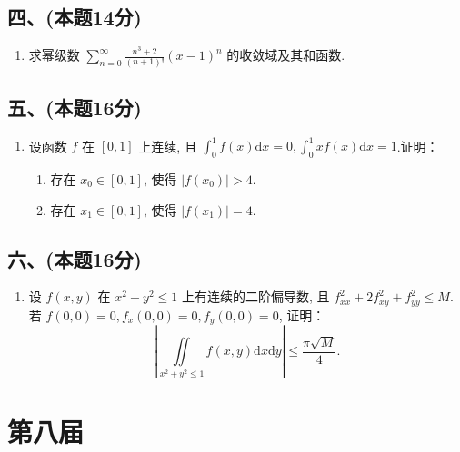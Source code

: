 \subsection*{四、(本题14分)}
\begin{enumerate}[start=8]
    \item 求幂级数 $\displaystyle\sum_{n=0}^{\infty} \frac{n^3 + 2}{(n + 1)!} (x - 1)^n$ 的收敛域及其和函数.
\end{enumerate}

\subsection*{五、(本题16分)}
\begin{enumerate}[start=9]
    \item 设函数 $f$ 在 $[0,  1]$ 上连续,  且 $\displaystyle\int_0^1 f(x)  \mathrm{d}x = 0,  \displaystyle\int_0^1 x f(x)  \mathrm{d}x = 1$.证明：
          \begin{enumerate}
              \item [(1)] 存在 $x_0 \in [0,  1]$,  使得 $|f(x_0)| > 4$.
              \item [(2)] 存在 $x_1 \in [0,  1]$,  使得 $|f(x_1)| = 4$.
          \end{enumerate}
\end{enumerate}

\subsection*{六、(本题16分)}
\begin{enumerate}[start=10]
    \item 设 $f(x,  y)$ 在 $x^2 + y^2 \leqslant 1$ 上有连续的二阶偏导数,  且 $f_{xx}^2 + 2f_{xy}^2 + f_{yy}^2 \leqslant M$.若 $f(0,  0) = 0,  f_x(0,  0) = 0,  f_y(0,  0) = 0$,  证明：
          \[
              \left| \iint\limits_{x^2 + y^2 \leqslant 1} f(x,  y)  \mathrm{d}x  \mathrm{d}y \right| \leqslant \frac{\pi \sqrt{M}}{4}.
          \]
\end{enumerate}


\newpage
\section{第八届}

